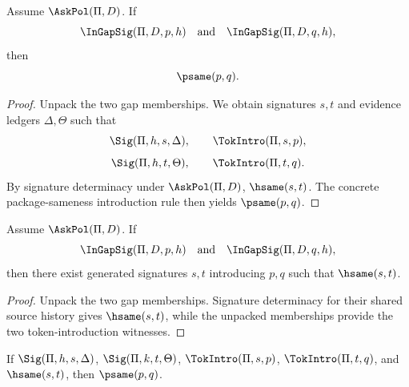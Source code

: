 \begin{theorem}
\label{thm:gap-separation-concrete}
Assume \(\AskPol(\Pi,D)\). If
$$
  \InGapSig(\Pi,D,p,h)
  \quad\text{and}\quad
  \InGapSig(\Pi,D,q,h),
$$
then
$$
  \psame(p,q).
$$
\end{theorem}

\begin{proof}
Unpack the two gap memberships. We obtain signatures \(s,t\) and evidence ledgers \(\Delta,\Theta\) such that
$$
  \Sig(\Pi,h,s,\Delta),\qquad
  \TokIntro(\Pi,s,p),
$$
$$
  \Sig(\Pi,h,t,\Theta),\qquad
  \TokIntro(\Pi,t,q).
$$
By signature determinacy under \(\AskPol(\Pi,D)\), \(\hsame(s,t)\). The concrete package-sameness introduction rule then yields \(\psame(p,q)\).
\end{proof}

\begin{theorem}
\label{thm:gap-memberships-share-signature}
Assume \(\AskPol(\Pi,D)\). If
$$
  \InGapSig(\Pi,D,p,h)
  \quad\text{and}\quad
  \InGapSig(\Pi,D,q,h),
$$
then there exist generated signatures \(s,t\) introducing \(p,q\) such that \(\hsame(s,t)\).
\end{theorem}

\begin{proof}
Unpack the two gap memberships. Signature determinacy for their shared source history gives \(\hsame(s,t)\), while the unpacked memberships provide the two token-introduction witnesses.
\end{proof}

\begin{theorem}
\label{thm:internalized-globalize-soundness-intro}
If \(\Sig(\Pi,h,s,\Delta)\), \(\Sig(\Pi,k,t,\Theta)\), \(\TokIntro(\Pi,s,p)\), \(\TokIntro(\Pi,t,q)\), and \(\hsame(s,t)\), then \(\psame(p,q)\).
\end{theorem}

